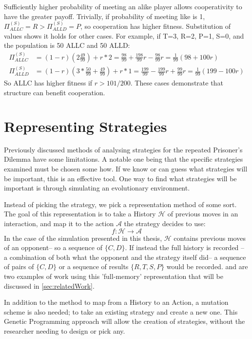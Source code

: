 \documentclass[a4paper,11pt,bcshonoursthesis,singlespace,twoside,thesisdraft,pdflatex]{cssethesis}
\begin{document}
Sufficiently higher probability of meeting an alike player allows cooperativity to have the greater payoff. 
Trivially, if probability of meeting like is 1, $\Pi^{(S)}_{ALLC}=R>\Pi^{(S)}_{ALLD}=P$, so cooperation has higher fitness.  
Substitution of values shows it holds for other cases. 
For example, if T=3, R=2, P=1, S=0, and the population is 50 ALLC and 50 ALLD:
\begin{align*}
\Pi^{(S)}_{ALLC}&=(1-r)(2\frac{49}{99})+r*2=\frac{98}{99}+\frac{198}{99}r-\frac{98}{99}r=\frac{1}{99}(98+100r)\\
\Pi^{(S)}_{ALLD}&=(1-r)(3*\frac{50}{99} + \frac{49}{99})+ r*1=\frac{199}{99}-\frac{199}{99}r+\frac{99}{99}r=\frac{1}{99}(199-100r)
\end{align*}
So ALLC has higher fitness if $r>101/200$. These cases demonstrate that structure can benefit cooperation. 
\section{Representing Strategies}
Previously discussed methods of analysing strategies for the repeated Prisoner's Dilemma have some limitations. 
A notable one being that the specific strategies examined must be chosen some how. 
If we know or can guess what strategies will be important, this is an effective tool. 
One way to find what strategies will be important is through simulating an evolutionary environment. 

Instead of picking the strategy, we pick a representation method of some sort. 
The goal of this representation is to take a History $\mathcal{H}$ of previous moves in an interaction, and map it to the action $\mathcal{A}$ the strategy decides to use:
\begin{equation}
f: \mathcal{H} \rightarrow \mathcal{A}
\end{equation}
In the case of the simulation presented in this thesis, $\mathcal{H}$ contains previous moves of an opponent-- so a sequence of $\{C,D\}$. 
If instead the full history is recorded -- a combination of both what the opponent and the strategy itself did-- a sequence of pairs of $\{C,D\}$ or a sequence of results $\{R,T,S,P\}$ would be recorded. \citet{Axelrod1987} and \citet{fogel1993evolving} are two examples of work using this 'full-memory' representation that will be discussed in \ref{sec:relatedWork}.

In addition to the method to map from a History to an Action, a mutation scheme is also needed; to take an existing strategy and create a new one. 
This Genetic Programming approach will allow the creation of strategies, without the researcher needing to design or pick any. 
\end{document}
